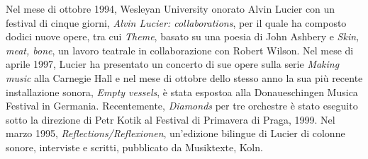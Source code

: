 \documentclass[9pt, twoside, a5paper]{extreport}
\begin{document}
\begin{multicols}{2}
{Nel mese di ottobre 1994, Wesleyan University onorato Alvin Lucier con un festival di cinque giorni, \textit{Alvin Lucier: collaborations}, per il quale ha composto dodici nuove opere, tra cui \textit{Theme}, basato su una poesia di John Ashbery e \textit{Skin, meat, bone}, un lavoro teatrale in collaborazione con Robert Wilson. Nel mese di aprile 1997, Lucier ha presentato un concerto di sue opere sulla serie \textit{Making music} alla Carnegie Hall e nel mese di ottobre dello stesso anno la sua più recente installazione sonora, \textit{Empty vessels}, è stata espostoa alla Donaueschingen Musica Festival in Germania. Recentemente, \textit{Diamonds} per tre orchestre è stato eseguito sotto la direzione di Petr Kotik al Festival di Primavera di Praga, 1999.
Nel marzo 1995, \textit{Reflections/Reflexionen}, un'edizione bilingue di Lucier di colonne sonore, interviste e scritti, pubblicato da Musiktexte, Koln.}




\end{multicols}
\end{document}
